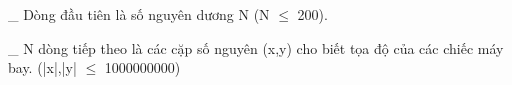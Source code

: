 \_ Dòng đầu tiên là số nguyên dương N (N $\le$ 200).  

   \_ N dòng tiếp theo là các cặp số nguyên (x,y) cho biết tọa độ của các chiếc máy bay. (|x|,|y| $\le$ 1000000000)